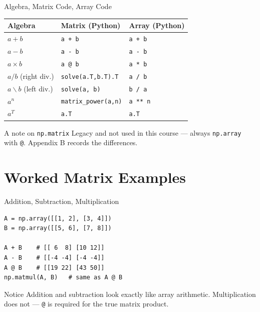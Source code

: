 \documentclass[9pt,aspectratio=169,xcolor=table]{beamer}
\begin{document}
\begin{frame}{Algebra, Matrix Code, Array Code}
    \leavevmode
    \small
    \begin{center}
    \begin{tabular}{lll}
        \toprule
        \textbf{Algebra} & \textbf{Matrix (Python)} & \textbf{Array (Python)} \\
        \midrule
        $a + b$ & \texttt{a + b} & \texttt{a + b} \\
        $a - b$ & \texttt{a - b} & \texttt{a - b} \\
        $a \times b$ & \texttt{a @ b} & \texttt{a * b} \\
        $a / b$ (right div.) & \texttt{solve(a.T,b.T).T} & \texttt{a / b} \\
        $a \backslash b$ (left div.) & \texttt{solve(a, b)} & \texttt{b / a} \\
        $a^n$ & \texttt{matrix\_power(a,n)} & \texttt{a ** n} \\
        $a^T$ & \texttt{a.T} & \texttt{a.T} \\
        \bottomrule
    \end{tabular}
    \end{center}

    \vspace{3mm}
    \begin{alertblock}{A note on \texttt{np.matrix}}
        Legacy and not used in this course --- always \texttt{np.array}
        with \texttt{@}. Appendix B records the differences.
    \end{alertblock}
\end{frame}

\section{Worked Matrix Examples}

\begin{frame}[fragile]{Addition, Subtraction, Multiplication}
    \leavevmode
\begin{lstlisting}
A = np.array([[1, 2], [3, 4]])
B = np.array([[5, 6], [7, 8]])

A + B    # [[ 6  8] [10 12]]
A - B    # [[-4 -4] [-4 -4]]
A @ B    # [[19 22] [43 50]]
np.matmul(A, B)   # same as A @ B
\end{lstlisting}

    \begin{block}{Notice}
        Addition and subtraction look exactly like array arithmetic.
        Multiplication does not --- \texttt{@} is required for the
        true matrix product.
    \end{block}
\end{frame}
\end{document}
